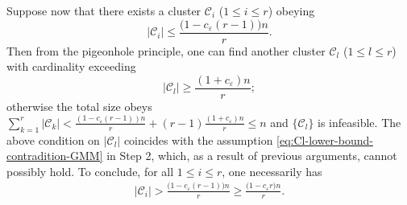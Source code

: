 \bigskip
{}
%
Suppose now that there exists a cluster $\mathcal{C}_{i}$ ($1\leq i\leq r$) obeying
%
\[
	|\mathcal{C}_{i}|\leq\frac{\big(1-c_{\varepsilon}(r-1)\big)n}{r}.
\]
%
Then from the pigeonhole principle, one can find another cluster $\mathcal{C}_{l}$ ($1\leq l\leq r$) with cardinality exceeding
%
\[
	|\mathcal{C}_{l}|\geq\frac{(1+c_{\varepsilon})n}{r};
\]
otherwise the total size obeys $\sum_{k=1}^r |\mathcal{C}_{k}| < \frac{ (1-c_{\varepsilon}(r-1) )n}{r} + (r-1)\frac{(1+c_{\varepsilon})n}{r} \leq n$ and $\{\mathcal{C}_l\}$ is infeasible.
%
The above condition on $|\mathcal{C}_{l}|$ coincides with the assumption \eqref{eq:Cl-lower-bound-contradition-GMM} in Step 2,
which, as a result of previous arguments, cannot possibly hold.
To conclude, for all $1\leq i\leq r$, one necessarily has
%
\begin{align}
	\label{eq:Cl-lower-bound-GMM-357}
	|\mathcal{C}_{i}| > \frac{\big(1-c_{\varepsilon}(r-1)\big)n}{r} \geq \frac{\big(1-c_{\varepsilon}r \big)n}{r}.
\end{align}


